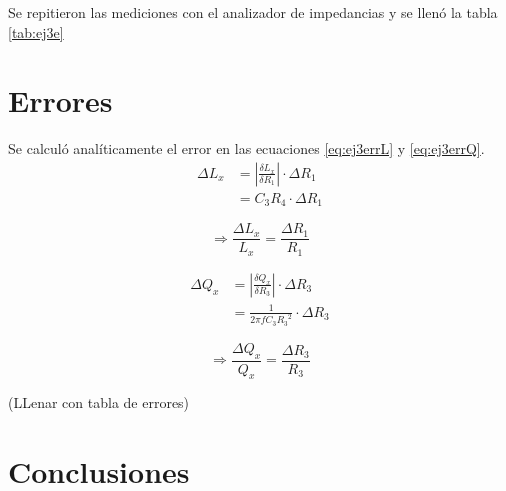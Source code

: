     Se repitieron las mediciones con el analizador de impedancias y se llenó la tabla \ref{tab:ej3e}
    

    \section{Errores}
    Se calculó analíticamente el error en las ecuaciones \ref{eq:ej3errL} y \ref{eq:ej3errQ}.
    \begin{equation*}
        \begin{split}
            \Delta L_x &=\left| \frac{\delta L_x}{\delta R_1} \right| \cdot \Delta R_1\\
                       &= C_3 R_4 \cdot \Delta R_1
        \end{split}
    \end{equation*}

    \begin{equation}
        \Rightarrow\frac{\Delta L_x}{L_x} = \frac{\Delta R_1}{R_1}
        \label{eq:ej3errL}
    \end{equation}

    \begin{equation*}
        \begin{split}
            \Delta Q_x &= \left| \frac{\delta Q_x}{\delta R_3} \right| \cdot \Delta R_3\\
                       &= \frac{1}{ 2 \pi f C_3 {R_3}^2} \cdot \Delta R_3
        \end{split}
    \end{equation*}

    \begin{equation}
        \Rightarrow\frac{\Delta Q_x}{Q_x} = \frac{\Delta R_3}{R_3}
        \label{eq:ej3errQ}
    \end{equation}

    (LLenar con tabla de errores)

    \section{Conclusiones}